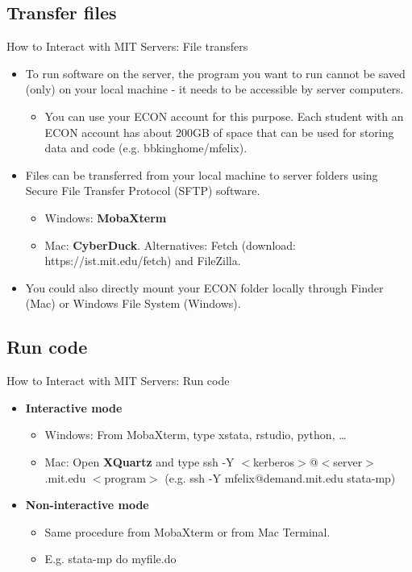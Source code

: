 \documentclass{beamer}
\begin{document}
\subsection{Transfer files}
\begin{frame}{How to Interact with MIT Servers: File transfers}
    \begin{itemize}
        \item To run software on the server, the program you want to run cannot be saved (only) on your local machine - it needs to be accessible by server computers.
        \begin{itemize}
            \item You can use your ECON account for this purpose. Each student with an ECON account has about 200GB of space that can be used for storing data and code (e.g. bbkinghome/mfelix).
        \end{itemize}
       \item Files can be transferred from your local machine to server folders using Secure File Transfer Protocol (SFTP) software.
        \begin{itemize}
             \item Windows: \textbf{MobaXterm}
             \item Mac: \textbf{CyberDuck}. Alternatives: Fetch (download: https://ist.mit.edu/fetch) and FileZilla.
        \end{itemize}
        \item You could also directly mount your ECON folder locally through Finder (Mac) or Windows File System (Windows).
    \end{itemize}
\end{frame}

\subsection{Run code}
\begin{frame}{How to Interact with MIT Servers: Run code}
    \begin{itemize}
        \item \textbf{Interactive mode}
         \begin{itemize}
            \item Windows: From MobaXterm, type xstata, rstudio, python, \dots
             \item Mac: Open \textbf{XQuartz} and type ssh -Y $<$kerberos$>$@$<$server$>$.mit.edu $<$program$>$ (e.g. ssh -Y mfelix@demand.mit.edu stata-mp)
         \end{itemize}
        \item \textbf{Non-interactive mode}
        \begin{itemize}
            \item Same procedure from MobaXterm or from Mac Terminal.
            \item E.g. stata-mp do myfile.do
         \end{itemize}
    \end{itemize}
\end{frame}
\end{document}
